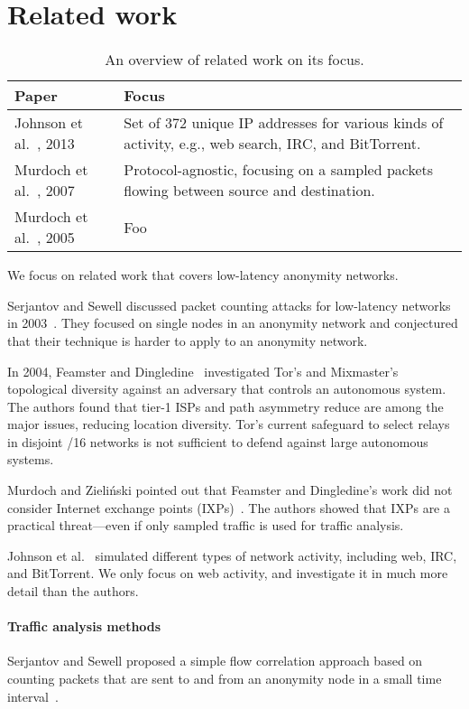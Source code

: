 \section{Related work}
\label{sec:related_work}

\begin{table*}[t]
	\begin{tabular}{lp{7cm}}
	\toprule
	\textbf{Paper} & \textbf{Focus} \\
	\midrule
	Johnson et al.~\cite{Johnson2013a}, 2013 & Set of 372 unique IP addresses for
	various kinds of activity, e.g., web search, IRC, and BitTorrent. \\
	Murdoch et al.~\cite{Murdoch2007a}, 2007 & Protocol-agnostic, focusing on a
	sampled packets flowing between source and destination. \\
	Murdoch et al.~\cite{Murdoch2005a}, 2005 & Foo \\
	\bottomrule
	\end{tabular}
	\caption{An overview of related work on its focus.}
	\label{tab:related-focus}
\end{table*}

We focus on related work that covers low-latency anonymity networks.

Serjantov and Sewell discussed packet counting attacks for low-latency networks
in 2003~\cite{Serjantov2003a}.  They focused on single nodes in an anonymity
network and conjectured that their technique is harder to apply to an anonymity
network.

In 2004, Feamster and Dingledine~\cite{Feamster2004a} investigated Tor's and
Mixmaster's topological diversity against an adversary that controls an
autonomous system.  The authors found that tier-1 ISPs and path asymmetry reduce
are among the major issues, reducing location diversity.  Tor's current
safeguard to select relays in disjoint /16 networks is not sufficient to defend
against large autonomous systems.

Murdoch and Zieli\'{n}ski pointed out that Feamster and Dingledine's work did
not consider Internet exchange points (IXPs)~\cite{Murdoch2007a}.  The authors
showed that IXPs are a practical threat---even if only sampled traffic is used
for traffic analysis.

Johnson et al.~\cite{Johnson2013a} simulated different types of network
activity, including web, IRC, and BitTorrent.  We only focus on web activity,
and investigate it in much more detail than the authors.

\paragraph{Traffic analysis methods}
Serjantov and Sewell proposed a simple flow correlation approach based on
counting packets that are sent to and from an anonymity node in a small time
interval~\cite{Serjantov2003a}.

